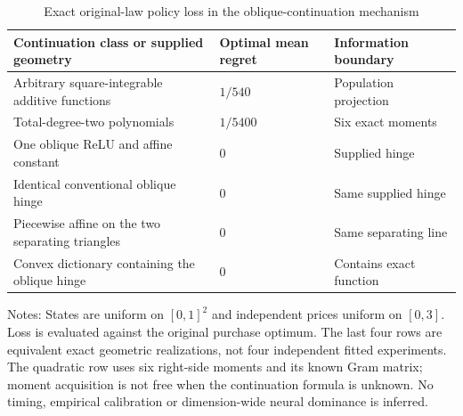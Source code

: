 \begin{table}[htbp]
\caption{Exact original-law policy loss in the oblique-continuation mechanism}\label{tab:decision99}
\centering\small
\begin{tabular}{@{}p{.52\linewidth}p{.17\linewidth}p{.22\linewidth}@{}}
\toprule
Continuation class or supplied geometry & Optimal mean regret & Information boundary\\\midrule
Arbitrary square-integrable additive functions & $1/540$ & Population projection\\
Total-degree-two polynomials & $1/5400$ & Six exact moments\\
One oblique ReLU and affine constant & $0$ & Supplied hinge\\
Identical conventional oblique hinge & $0$ & Same supplied hinge\\
Piecewise affine on the two separating triangles & $0$ & Same separating line\\
Convex dictionary containing the oblique hinge & $0$ & Contains exact function\\\bottomrule
\end{tabular}
\par\smallskip\parbox{.96\linewidth}{\footnotesize Notes: States are uniform on $[0,1]^2$ and independent prices uniform on $[0,3]$. Loss is evaluated against the original purchase optimum. The last four rows are equivalent exact geometric realizations, not four independent fitted experiments. The quadratic row uses six right-side moments and its known Gram matrix; moment acquisition is not free when the continuation formula is unknown. No timing, empirical calibration or dimension-wide neural dominance is inferred.}
\end{table}
